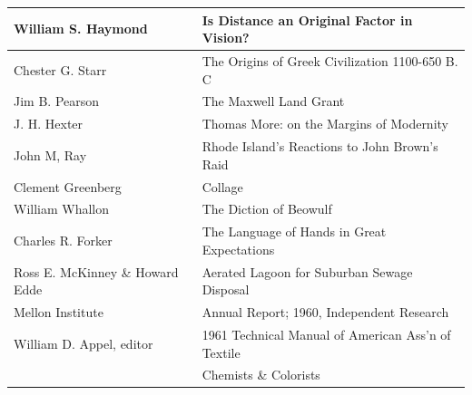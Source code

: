 \documentclass{article}
\begin{document}
\begin{appendices}
\begin{tabular}{|ll|}
\hline
William S. Haymond & Is Distance an Original Factor in Vision?\\
\hline
Chester G. Starr & The Origins of Greek Civilization 1100-650 B. C\\
\hline
Jim B. Pearson & The Maxwell Land Grant\\
\hline
J. H. Hexter & Thomas More: on the Margins of Modernity\\
\hline
John M, Ray & Rhode Island's Reactions to John Brown's Raid\\
\hline
Clement Greenberg & Collage\\
\hline
William Whallon & The Diction of Beowulf\\
\hline
Charles R. Forker & The Language of Hands in Great Expectations\\
\hline
Ross E. McKinney \& Howard Edde & Aerated Lagoon for Suburban Sewage Disposal\\
\hline
Mellon Institute & Annual Report; 1960, Independent Research\\
\hline
William D. Appel, editor & 1961 Technical Manual of American Ass'n of Textile\\
 & Chemists \& Colorists\\ %
\hline
\end{tabular}
\end{appendices}


\end{document}
